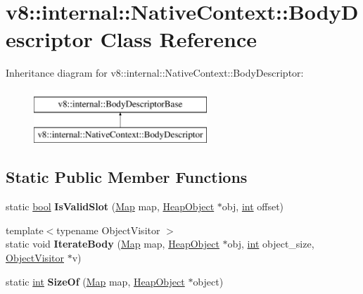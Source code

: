 \hypertarget{classv8_1_1internal_1_1NativeContext_1_1BodyDescriptor}{}\section{v8\+:\+:internal\+:\+:Native\+Context\+:\+:Body\+Descriptor Class Reference}
\label{classv8_1_1internal_1_1NativeContext_1_1BodyDescriptor}
Inheritance diagram for v8\+:\+:internal\+:\+:Native\+Context\+:\+:Body\+Descriptor\+:\begin{figure}[H]
\begin{center}
\leavevmode
\includegraphics[height=2.000000cm]{classv8_1_1internal_1_1NativeContext_1_1BodyDescriptor}
\end{center}
\end{figure}
\subsection*{Static Public Member Functions}
\begin{DoxyCompactItemize}
\item 
\mbox{\label{classv8_1_1internal_1_1NativeContext_1_1BodyDescriptor_afd9dae452a979269f901f4314979f4e3}} 
static \mbox{\hyperlink{classbool}{bool}} {\bfseries Is\+Valid\+Slot} (\mbox{\hyperlink{classv8_1_1internal_1_1Map}{Map}} map, \mbox{\hyperlink{classv8_1_1internal_1_1HeapObject}{Heap\+Object}} $\ast$obj, \mbox{\hyperlink{classint}{int}} offset)
\item 
\mbox{\label{classv8_1_1internal_1_1NativeContext_1_1BodyDescriptor_a62f0fae5a53036d1c813643b1ddf6e4e}} 
{\footnotesize template$<$typename Object\+Visitor $>$ }\\static void {\bfseries Iterate\+Body} (\mbox{\hyperlink{classv8_1_1internal_1_1Map}{Map}} map, \mbox{\hyperlink{classv8_1_1internal_1_1HeapObject}{Heap\+Object}} $\ast$obj, \mbox{\hyperlink{classint}{int}} object\+\_\+size, \mbox{\hyperlink{classv8_1_1internal_1_1ObjectVisitor}{Object\+Visitor}} $\ast$v)
\item 
\mbox{\label{classv8_1_1internal_1_1NativeContext_1_1BodyDescriptor_a5067b6e67c52e71ff4c71712e8b36e7b}} 
static \mbox{\hyperlink{classint}{int}} {\bfseries Size\+Of} (\mbox{\hyperlink{classv8_1_1internal_1_1Map}{Map}} map, \mbox{\hyperlink{classv8_1_1internal_1_1HeapObject}{Heap\+Object}} $\ast$object)
\end{DoxyCompactItemize}
